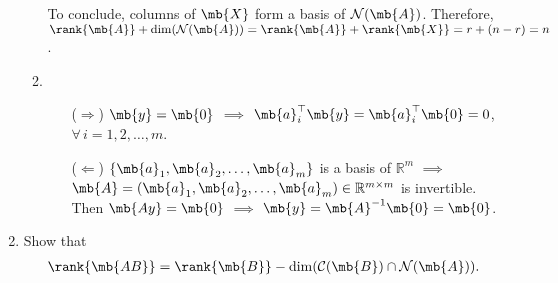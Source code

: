 \begin{exercise}
\begin{enumerate}
\begin{solution}
\begin{enumerate}
						To conclude, columns of $\mb{X}$ form a basis of $\mathcal{N}(\mb{A})$.
						Therefore, $\rank{\mb{A}} + \dim(\mathcal{N}(\mb{A})) = \rank{\mb{A}} + \rank{\mb{X}} = r + (n-r) = n$.
					\item
						\begin{itemize}
							\item [($\Rightarrow$)]
								$\mb{y}=\mb{0}$ $\implies$ $\mb{a}_i^\top\mb{y}=\mb{a}_i^\top\mb{0}=0$, $\forall\,i=1,2,\dots,m$.
							\item [($\Leftarrow$)]
								$\{\mb{a}_1,\mb{a}_2,\ldots,\mb{a}_m\}$ is a basis of $\mathbb{R}^m$ $\implies$ $\mb{A} = (\mb{a}_1,\mb{a}_2,\ldots,\mb{a}_m) \in \mathbb{R}^{m\times m}$ is invertible. Then $\mb{Ay}=\mb{0}$ $\implies$ $\mb{y}=\mb{A}^{-1}\mb{0}=\mb{0}$.
								\qedhere
						\end{itemize}
				\end{enumerate}
			\end{solution}

		\item Show that
			\begin{align}\label{eqn:rankaba}
				\rank{\mb{AB}}=\rank{\mb{B}}-\dim(\mathcal{C}(\mb{B})\cap \mathcal{N}(\mb{A})).
			\end{align}


\end{enumerate}
\end{exercise}
